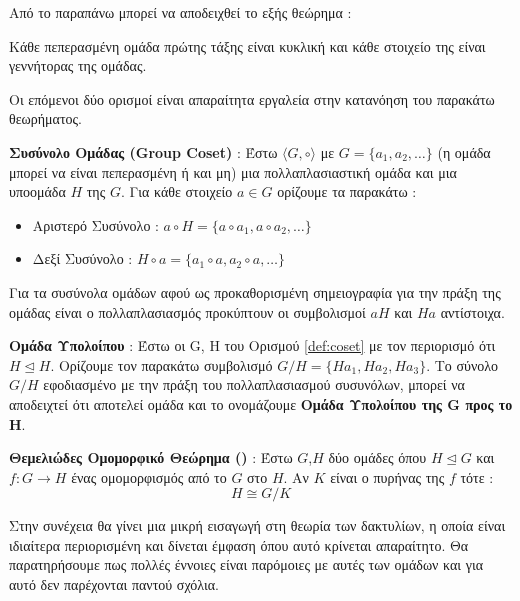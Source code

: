Από το παραπάνω μπορεί να αποδειχθεί το εξής θεώρημα :
\begin{theorem}
Κάθε πεπερασμένη ομάδα πρώτης τάξης είναι κυκλική και κάθε στοιχείο της είναι γεννήτορας της ομάδας.
\end{theorem}

Οι επόμενοι δύο ορισμοί είναι απαραίτητα εργαλεία στην κατανόηση του παρακάτω θεωρήματος.

\begin{definition}
\label{def:coset}
\textbf{Συσύνολο Ομάδας (Group Coset)} : Έστω $\langle G, \circ \rangle$ με $G = \{a_1, a_2, \ldots\}$ (η ομάδα μπορεί να είναι πεπερασμένη ή και μη) μια πολλαπλασιαστική ομάδα και μια υποομάδα $Η$ της $G$. Για κάθε στοιχείο $a \in G$ ορίζουμε τα παρακάτω :
\begin{itemize}
    \item Αριστερό Συσύνολο : $a \circ H = \{a \circ a_1, a \circ a_2, \ldots\}$
    \item Δεξί Συσύνολο : $H \circ a = \{a_1 \circ a, a_2 \circ a, \ldots\}$
\end{itemize}
\end{definition}

Για τα συσύνολα ομάδων αφού ως προκαθορισμένη σημειογραφία για την πράξη της ομάδας είναι ο πολλαπλασιασμός προκύπτουν οι συμβολισμοί $a Η$ και $H a$ αντίστοιχα.

\begin{definition}
\textbf{Ομάδα Υπολοίπου} : Έστω οι G, H του Ορισμού \ref{def:coset} με τον περιορισμό ότι $H \trianglelefteq H$. Ορίζουμε τον παρακάτω συμβολισμό $G / H = \{Ha_1, Ha_2, Ha_3\}$. Το σύνολο $G / H$ εφοδιασμένο με την πράξη του πολλαπλασιασμού συσυνόλων, μπορεί να αποδειχτεί ότι αποτελεί ομάδα και το ονομάζουμε \textbf{Ομάδα Υπολοίπου της G προς το H}.
\end{definition}

\begin{definition}
\textbf{Θεμελιώδες Ομομορφικό Θεώρημα ()} : Έστω $G$,$H$ δύο ομάδες όπου $H \trianglelefteq G$ και $f : G \rightarrow H$ ένας ομομορφισμός από το $G$ στο $H$. Αν $K$ είναι ο πυρήνας της $f$ τότε :
$$
Η \cong G / K
$$
\end{definition}

Στην συνέχεια θα γίνει μια μικρή εισαγωγή στη θεωρία των δακτυλίων, η οποία είναι ιδιαίτερα περιορισμένη και δίνεται έμφαση όπου αυτό κρίνεται απαραίτητο. Θα παρατηρήσουμε πως πολλές έννοιες είναι παρόμοιες με αυτές των ομάδων και για αυτό δεν παρέχονται παντού σχόλια.

